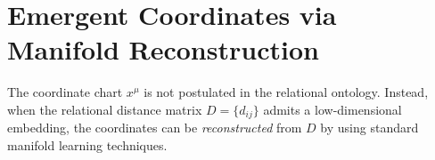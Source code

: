 \section{Emergent Coordinates via Manifold Reconstruction}
  \label{subsec:emergent-coordinates}

  The coordinate chart $x^\mu$ is not postulated in the relational ontology.
  Instead, when the relational distance matrix $D=\{d_{ij}\}$ admits a low-dimensional
  embedding, the coordinates can be \emph{reconstructed} from $D$ by using standard manifold
  learning techniques.

  
  
  
  
  
  
  
